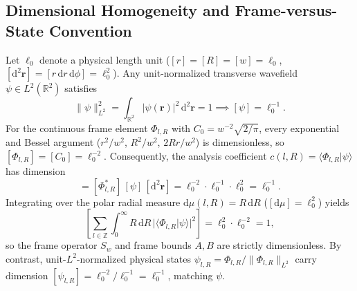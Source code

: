\documentclass[10pt,letterpaper]{article}
\newcommand{\braket}[2]{\langle #1 | #2 \rangle}
\newcommand{\norm}[1]{\lVert #1 \rVert}
\newcommand{\abs}[1]{\lvert #1 \rvert}
\newcommand{\dd}{\mathrm{d}}
\numberwithin{equation}{section}
\begin{document}
\subsection{Dimensional Homogeneity and Frame-versus-State Convention}
Let $\ell_0$ denote a physical length unit ($[r] = [R] = [w] = \ell_0$, $[\dd^2\mathbf{r}] = [r\,\dd r\,\dd\phi] = \ell_0^2$). Any unit-normalized transverse wavefield $\psi \in L^2(\mathbb{R}^2)$ satisfies
\begin{equation}
  \norm{\psi}_{L^2}^2 = \int_{\mathbb{R}^2} \abs{\psi(\mathbf{r})}^2\,\dd^2\mathbf{r} = 1 \implies [\psi] = \ell_0^{-1}.
\end{equation}
For the continuous frame element $\Phi_{l,R}$ with $C_0 = w^{-2}\sqrt{2/\pi}$, every exponential and Bessel argument ($r^2/w^2$, $R^2/w^2$, $2Rr/w^2$) is dimensionless, so $[\Phi_{l,R}] = [C_0] = \ell_0^{-2}$. Consequently, the analysis coefficient $c(l,R) = \braket{\Phi_{l,R}}{\psi}$ has dimension
\begin{equation}
  [\braket{\Phi_{l,R}}{\psi}] = [\Phi_{l,R}^*]\,[\psi]\,[\dd^2\mathbf{r}] = \ell_0^{-2} \cdot \ell_0^{-1} \cdot \ell_0^2 = \ell_0^{-1}.
\end{equation}
Integrating over the polar radial measure $\dd\mu(l,R) = R\,\dd R$ ($[\dd\mu] = \ell_0^2$) yields
\begin{equation}
  \left[\sum_{l\in\mathbb{Z}} \int_0^\infty R\,\dd R\,\abs{\braket{\Phi_{l,R}}{\psi}}^2\right] = \ell_0^2 \cdot \ell_0^{-2} = 1,
\end{equation}
so the frame operator $S_w$ and frame bounds $A, B$ are strictly dimensionless. By contrast, unit-$L^2$-normalized physical states $\psi_{l,R} = \Phi_{l,R}/\norm{\Phi_{l,R}}_{L^2}$ carry dimension $[\psi_{l,R}] = \ell_0^{-2}/\ell_0^{-1} = \ell_0^{-1}$, matching $\psi$.
\end{document}
